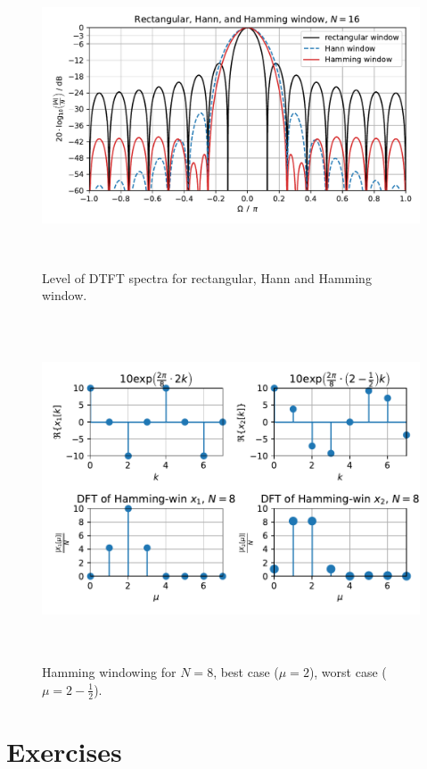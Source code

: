 \documentclass[11pt,a4paper,DIV=12]{scrartcl}
\begin{document}
\begin{figure}
		\centering
		\includegraphics[width=6in, height=3.5in]{graphics/DTFTRectHanningHammingWin_log.pdf}
		\caption{Level of DTFT spectra for rectangular, Hann and Hamming
		window.}
		\label{DTFTRectHanningHammingWin_log}
\end{figure}
\begin{figure}
		\centering
		\includegraphics[width=6in, height=4in]{graphics/DFTbestworstcase_HammWin.pdf}
		\caption{Hamming windowing for $N=8$, best case ($\mu=2$),
		worst case ($\mu=2-\frac{1}{2}$).}
		\label{DFTbestworstcase_HammWin}
\end{figure}

\cleardoublepage
\section{Exercises}
\end{document}
